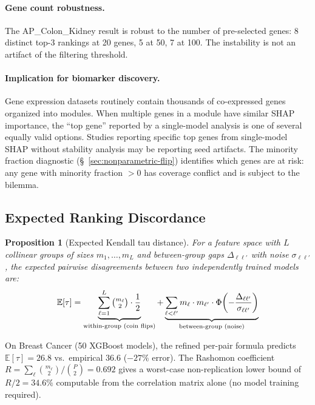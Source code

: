 \documentclass{article}
\newtheorem{proposition}[theorem]{Proposition}
\newcommand{\E}{\mathbb{E}}
\begin{document}
\paragraph{Gene count robustness.}
The AP\_Colon\_Kidney result is robust to the number of pre-selected genes: 8 distinct top-3 rankings at 20 genes, 5 at 50, 7 at 100. The instability is not an artifact of the filtering threshold.

\paragraph{Implication for biomarker discovery.}
Gene expression datasets routinely contain thousands of co-expressed genes organized into modules. When multiple genes in a module have similar SHAP importance, the ``top gene'' reported by a single-model analysis is one of several equally valid options. Studies reporting specific top genes from single-model SHAP without stability analysis may be reporting seed artifacts. The minority fraction diagnostic (\S~\ref{sec:nonparametric-flip}) identifies which genes are at risk: any gene with minority fraction $> 0$ has coverage conflict and is subject to the bilemma.

\subsection{Expected Ranking Discordance}

\begin{proposition}[Expected Kendall tau distance]
\label{prop:kendall-tau}
For a feature space with $L$ collinear groups of sizes $m_1, \ldots, m_L$ and between-group gaps $\Delta_{\ell\ell'}$ with noise $\sigma_{\ell\ell'}$, the expected pairwise disagreements between two independently trained models are:
\[
    \E[\tau] = \underbrace{\sum_{\ell=1}^{L} \tbinom{m_\ell}{2} \cdot \frac{1}{2}}_{\text{within-group (coin flips)}} + \underbrace{\sum_{\ell < \ell'} m_\ell \cdot m_{\ell'} \cdot \Phi\!\left(-\frac{\Delta_{\ell\ell'}}{\sigma_{\ell\ell'}}\right)}_{\text{between-group (noise)}}
\]
\end{proposition}

On Breast Cancer (50 XGBoost models), the refined per-pair formula predicts $\E[\tau] = 26.8$ vs.\ empirical $36.6$ ($-27\%$ error). The Rashomon coefficient $R = \sum_\ell \binom{m_\ell}{2}/\binom{P}{2} = 0.692$ gives a worst-case non-replication lower bound of $R/2 = 34.6\%$ computable from the correlation matrix alone (no model training required).
\end{document}

